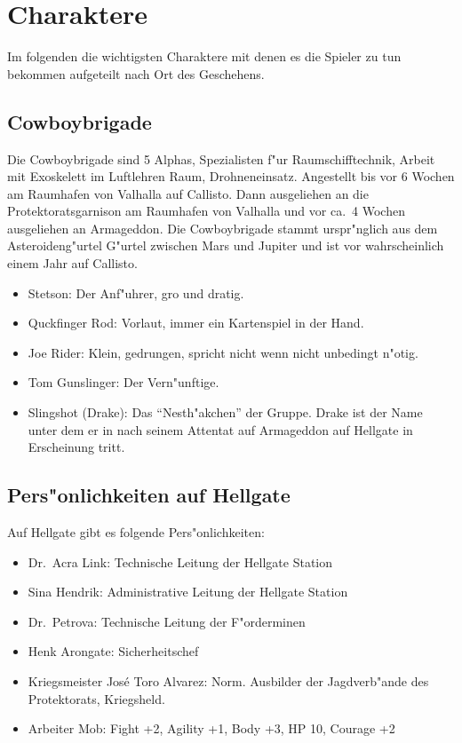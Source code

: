 \chapter{Charaktere}

Im folgenden die wichtigsten Charaktere mit denen es die Spieler zu tun bekommen aufgeteilt nach Ort des Geschehens.

\section{Cowboybrigade}

Die Cowboybrigade sind 5 Alphas, Spezialisten f"ur Raumschifftechnik, Arbeit mit Exoskelett im Luftlehren Raum, Drohneneinsatz.
Angestellt bis vor 6 Wochen am Raumhafen von Valhalla auf Callisto. Dann ausgeliehen an die Protektoratsgarnison am Raumhafen von Valhalla und vor ca.~4 Wochen ausgeliehen an Armageddon. Die Cowboybrigade stammt urspr"nglich aus dem Asteroideng"urtel G"urtel zwischen Mars und Jupiter und ist vor wahrscheinlich einem Jahr auf Callisto.

\begin{itemize}
    \item Stetson: Der Anf"uhrer, gro\3 und dratig.
    \item Quckfinger Rod: Vorlaut, immer ein Kartenspiel in der Hand.
    \item Joe Rider: Klein, gedrungen, spricht nicht wenn nicht unbedingt n"otig.
    \item Tom Gunslinger: Der Vern"unftige.
    \item Slingshot (Drake): Das "`Nesth"akchen"' der Gruppe. Drake ist der Name unter dem er in nach seinem Attentat 
    auf Armageddon auf Hellgate in Erscheinung tritt.
\end{itemize}

\newpage

\section{Pers"onlichkeiten auf Hellgate}

Auf Hellgate gibt es folgende Pers"onlichkeiten: 

\begin{itemize}
    \item Dr.~Acra Link: Technische Leitung der Hellgate Station
    \item Sina Hendrik: Administrative Leitung der Hellgate Station
    \item Dr.~Petrova: Technische Leitung der F"orderminen
    \item Henk Arongate: Sicherheitschef    
    \item Kriegsmeister Jos\'{e} \frqq{}Toro\flqq{} Alvarez: Norm. Ausbilder der Jagdverb"ande des Protektorats, Kriegsheld.
    \item Arbeiter Mob: Fight +2, Agility +1, Body +3, HP 10, Courage +2
\end{itemize}

